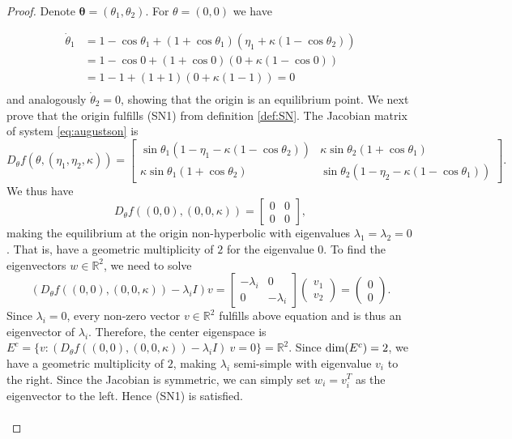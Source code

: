\documentclass{article}
\theoremstyle{definition}
\begin{document}
\begin{refsection}
\begin{proof} 
Denote $\mathbf{\theta} = (\theta_1,\theta_2)$. For $\theta=(0,0)$ we have 

\begin{align*}
\dot{\theta}_1 &= 1 - \cos\theta_1 + \left(1 + \cos\theta_1\right) \left(\eta_1 + \kappa \left(1 - \cos\theta_2\right)\right)\\ 
&= 1 - \cos0 + \left(1 + \cos0\right) \left(0 + \kappa \left(1 - \cos0\right)\right)\\
&= 1 - 1 + \left(1 + 1\right) \left(0 + \kappa \left(1 - 1\right)\right) = 0\\
\end{align*}
and analogously $\dot \theta_2=0$, showing that the origin is an equilibrium point.
We next prove that the origin fulfills (SN1) from definition \ref{def:SN}. The Jacobian matrix of system \ref{eq:augustson} is
$$D_{\theta} f(\theta,(\eta_1,\eta_2,\kappa))=\begin{bmatrix}
\sin\theta_1(1-\eta_1-\kappa(1-\cos\theta_2)) & \kappa\sin\theta_2(1+\cos\theta_1) \\
\kappa\sin\theta_1(1+\cos\theta_2) & \sin\theta_2(1-\eta_2-\kappa(1-\cos\theta_1)) 
\end{bmatrix}.$$ We thus have  
$$D_{\theta} f((0,0),(0,0,\kappa))=\begin{bmatrix}
0 & 0 \\
0 & 0
\end{bmatrix},$$ making the equilibrium at the origin non-hyperbolic with eigenvalues $\lambda_1=\lambda_2=0$. That is, have a geometric multiplicity of $2$ for the eigenvalue $0$. To find the eigenvectors $w\in \mathbb{R}^2$, we need to solve $$(D_{\theta} f((0,0),(0,0,\kappa))-\lambda_i I)v=
\begin{bmatrix}
-\lambda_i & 0 \\
0 & -\lambda_i
\end{bmatrix}
\begin{pmatrix}
v_1 \\
v_2
\end{pmatrix}
= \begin{pmatrix} 0 \\ 0\end{pmatrix}.
$$
Since $\lambda_i=0$, every non-zero vector $v\in\mathbb{R}^2$ fulfills above equation and is thus an eigenvector of $\lambda_i$. Therefore, the center eigenspace is $E^c=\{v: (D_{\theta} f((0,0),(0,0,\kappa))-\lambda_i I) \ v=0\} = \mathbb{R}^2$. Since $\textnormal{dim}(E^c)=2$, we have a geometric multiplicity of $2$, making $\lambda_i$ semi-simple with eigenvalue $v_i$ to the right. Since the Jacobian is symmetric, we can simply set $w_i=v_i^T$ as the eigenvector to the left. Hence (SN1) is satisfied.\\ \\

\end{proof}
\end{refsection}
\end{document}
